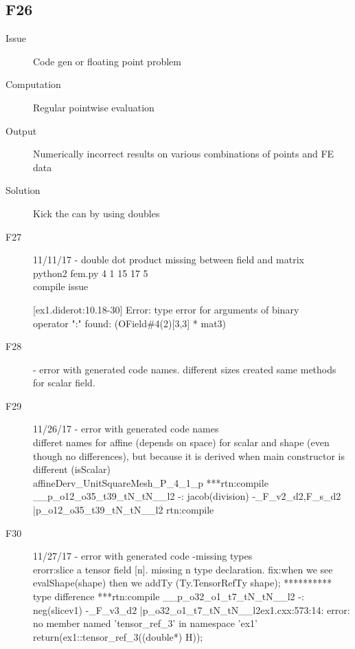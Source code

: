\subsection{F26}

\begin{description}
\item[Issue] Code gen or floating point problem
\item[Computation] Regular pointwise evaluation
\item[Output] Numerically incorrect results on various combinations of points and FE data
\item[Solution] Kick the can by using doubles
\end{description}


\begin{description}

\item[F27]
 11/11/17
- double dot product missing between field and matrix \\
 python2 fem.py 4 1 15 17  5\\
compile issue\

[ex1.diderot:10.18-30] Error: type error for arguments of binary \\ operator ":"
  found: (OField\#4(2)[3,3] * mat3)
\item [F28]
- error with generated code names.
different sizes created same methods \\
for scalar field.
\item[F29]
11/26/17
- error with generated code names\\
differet names for affine (depends on space) for scalar and shape (even though no differences), but because it is derived when main constructor is different (isScalar)\\
affineDerv\_UnitSquareMesh\_P\_4\_1\_p
***rtn:compile \_\_p\_o12\_o35\_t39\_tN\_tN\_\_l2
	 -: jacob(division)
	-\_F\_v2\_d2,F\_s\_d2 |p\_o12\_o35\_t39\_tN\_tN\_\_l2
	rtn:compile 
\item[F30] 
11/27/17
- error with generated code -missing types\\
erorr:slice a tensor field [n]. missing n type declaration. 
fix:when we see evalShape(shape) then we addTy (Ty.TensorRefTy shape);
********** type difference
***rtn:compile \_\_p\_o32\_o1\_t7\_tN\_tN\_\_l2
	 -: neg(slicev1)
	-\_F\_v3\_d2 |p\_o32\_o1\_t7\_tN\_tN\_\_l2ex1.cxx:573:14: error: no member named 'tensor\_ref\_3' in namespace 'ex1'
        return(ex1::tensor\_ref\_3((double*) H));


\end{description}
